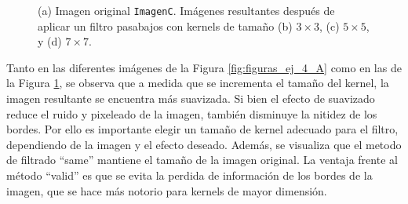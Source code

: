 \documentclass[11pt, twocolumn]{article}
\begin{document}
\begin{figure}[htpb]
  \centering
  \hfill
  \hfill
  \hfill
  \hfill
  \caption{(a) Imagen original \texttt{ImagenC}. Imágenes resultantes después de aplicar un filtro pasabajos con kernels de tamaño (b) $3 \times 3$, (c) $5 \times 5$, y (d) $7 \times 7$.}
  \label{fig:figuras_ej_4_C}
\end{figure}

Tanto en las diferentes imágenes de la Figura \ref{fig:figuras_ej_4_A} como en las de la Figura \ref{fig:figuras_ej_4_C}, se observa que a medida que se incrementa el tamaño del kernel, la imagen resultante se encuentra más suavizada. Si bien el efecto de suavizado reduce el ruido y pixeleado de la imagen, también disminuye la nitidez de los bordes. Por ello es importante elegir un tamaño de kernel adecuado para el filtro, dependiendo de la imagen y el efecto deseado. Además, se visualiza que el metodo de filtrado ``same'' mantiene el tamaño de la imagen original. La ventaja frente al método ``valid'' es que se evita la perdida de información de los bordes de la imagen, que se hace más notorio para kernels de mayor dimensión.
\end{document}
